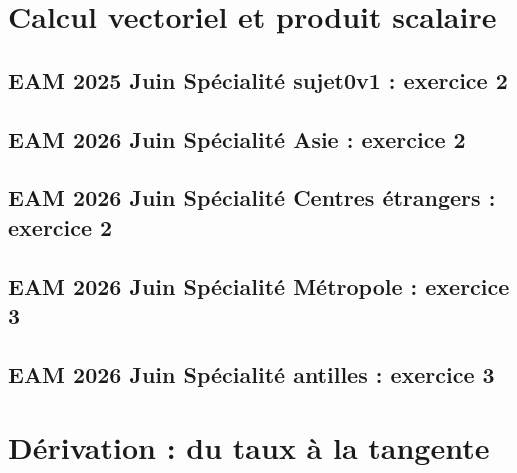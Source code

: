 \documentclass[lang=fr,edition=teacher,layout=sheet]{mxbook}
\begin{document}
\begingroup\endgroup
\par\bigskip
\clearpage\section*{Calcul vectoriel et produit scalaire}
\subsection*{EAM 2025 Juin Spécialité sujet0v1 : exercice 2}
\begingroup\endgroup
\par\bigskip
{}\subsection*{EAM 2026 Juin Spécialité Asie : exercice 2}
\begingroup\endgroup
\par\bigskip
{}\subsection*{EAM 2026 Juin Spécialité Centres étrangers : exercice 2}
\begingroup\endgroup
\par\bigskip
{}\subsection*{EAM 2026 Juin Spécialité Métropole : exercice 3}
\begingroup\endgroup
\par\bigskip
{}\subsection*{EAM 2026 Juin Spécialité antilles : exercice 3}
\begingroup\endgroup
\par\bigskip
\clearpage\section*{Dérivation : du taux à la tangente}
\end{document}
